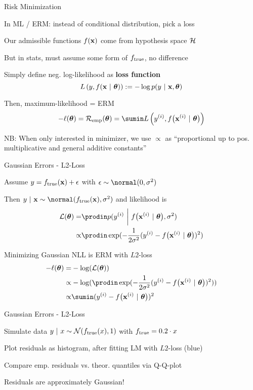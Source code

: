 \documentclass[11pt,compress,t,notes=noshow, xcolor=table]{beamer}
\begin{document}
\begin{framei}[sep=M]{Risk Minimization} 

\item In ML / ERM: instead of conditional distribution, pick a loss 
\item Our admissible functions $f(\mathbf{x})$ come from hypothesis space $\mathcal{H}$
\item But in stats, must assume some form of $f_{\text{true}}$, no difference
\item Simply define neg. log-likelihood as \textbf{loss function} 
$$ L\left(y, f(\mathbf{x} ~|~ \bm{\theta})\right) := - \log p(y ~|~\mathbf{x}, \bm{\theta}) $$
\item Then, maximum-likelihood 
 = ERM
$$- \loglt = \risket = \sumin \Lxyit$$
\item NB: When only interested in minimizer, we use $\propto$ as \enquote{proportional up to pos. multiplicative and general additive constants}

\end{framei}


\begin{framei}[sep=M]{Gaussian Errors - L2-Loss} 

\item Assume $y = f_{\text{true}}(\mathbf{x}) + \epsilon$ with $\eps \sim \normal(0, \sigma^2)$ 
\item Then $y~|~\xv \sim \normal(\ftrue(\xv), \sigma^2)$ and likelihood is 
{\small
\begin{align*}
\LL(\thetav) =& \prodin \pdf(\yi ~\bigg|~ \fxit, \sigma^2) \\ 
\propto& \prodin \exp(-\frac{1}{2\sigma^2} (\yi - \fxit)^2)
\end{align*}
}
\item Minimizing Gaussian NLL is ERM with $L2$-loss
\begin{align*}
- \loglt =& - \log(\LL(\thetav)) \\
\propto& - \log(\prodin \exp(-\frac{1}{2\sigma^2} (\yi - \fxit)^2)) \\
\propto& \sumin (\yi - \fxit)^2
\end{align*}

\end{framei}


\begin{framei}[sep=M]{Gaussian Errors - L2-Loss} 

\item Simulate data $y ~|~x \sim \mathcal{N}(f_{\text{true}}(x), 1)$ with $f_{\text{true}} = 0.2 \cdot x$ 
\item Plot residuals as histogram, after fitting LM with $L2$-loss (blue)
\item Compare emp. residuals vs. theor. quantiles via Q-Q-plot

\vfill


\vfill

\item Residuals are approximately Gaussian!

\end{framei}
\end{document}
